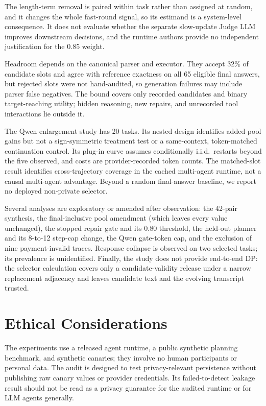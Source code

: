 \documentclass[11pt]{article}
\begin{document}
The length-term removal is paired within task rather than assigned at random, and it changes the whole fast-round signal, so its estimand is a system-level consequence. It does not evaluate whether the separate slow-update Judge LLM improves downstream decisions, and the runtime authors provide no independent justification for the $0.85$ weight.

Headroom depends on the canonical parser and executor. They accept 32\% of candidate slots and agree with reference exactness on all 65 eligible final answers, but rejected slots were not hand-audited, so generation failures may include parser false negatives. The bound covers only recorded candidates and binary target-reaching utility; hidden reasoning, new repairs, and unrecorded tool interactions lie outside it.

The Qwen enlargement study has 20 tasks. Its nested design identifies added-pool gains but not a sign-symmetric treatment test or a same-context, token-matched continuation control. Its plug-in curve assumes conditionally i.i.d.\ restarts beyond the five observed, and costs are provider-recorded token counts. The matched-slot result identifies cross-trajectory coverage in the cached multi-agent runtime, not a causal multi-agent advantage. Beyond a random final-answer baseline, we report no deployed non-private selector.

Several analyses are exploratory or amended after observation: the 42-pair synthesis, the final-inclusive pool amendment (which leaves every value unchanged), the stopped repair gate and its 0.80 threshold, the held-out planner and its 8-to-12 step-cap change, the Qwen gate-token cap, and the exclusion of nine payment-invalid traces. Response collapse is observed on two selected tasks; its prevalence is unidentified. Finally, the study does not provide end-to-end DP: the selector calculation covers only a candidate-validity release under a narrow replacement adjacency and leaves candidate text and the evolving transcript trusted.

\section{Ethical Considerations}

The experiments use a released agent runtime, a public synthetic planning benchmark, and synthetic canaries; they involve no human participants or personal data. The audit is designed to test privacy-relevant persistence without publishing raw canary values or provider credentials. Its failed-to-detect leakage result should not be read as a privacy guarantee for the audited runtime or for LLM agents generally.




\end{document}
